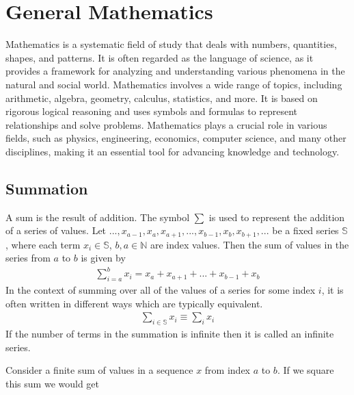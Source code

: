 \chapter{General Mathematics}
\thispagestyle{fancy}

Mathematics is a systematic field of study that deals with numbers, quantities, shapes, and patterns. It is often regarded as the language of science, as it provides a framework for analyzing and understanding various phenomena in the natural and social world. Mathematics involves a wide range of topics, including arithmetic, algebra, geometry, calculus, statistics, and more. It is based on rigorous logical reasoning and uses symbols and formulas to represent relationships and solve problems. Mathematics plays a crucial role in various fields, such as physics, engineering, economics, computer science, and many other disciplines, making it an essential tool for advancing knowledge and technology.


\section{Summation}

\begin{defn}
	A sum is the result of addition. The symbol $\sum$ is used to represent the addition of a series of values. Let $..., x_{a-1}, x_a, x_{a+1}, ... ,x_{b-1}, x_b, x_{b+1}, ...$ be a fixed series $\mathbb{S}$, where each term $x_i\in\mathbb{S}$, $b, a \in \mathbb{N}$ are index values. Then the sum of values in the series from $a$ to $b$ is given by
	\begin{align}
		\sum_{i=a}^{b} x_i = x_a +  x_{a+1} + ... + x_{b-1} + x_b
	\end{align}
	In the context of summing over all of the values of a series for some index $i$, it is often written in different ways which are typically equivalent.
	\begin{align}
		\sum_{i\in\mathbb{S}} x_i \equiv \sum_{i} x_i
	\end{align}
	If the number of terms in the summation is infinite then it is called an infinite series.
\end{defn}

Consider a finite sum of values in a sequence $x$ from index $a$ to $b$. If we square this sum we would get

